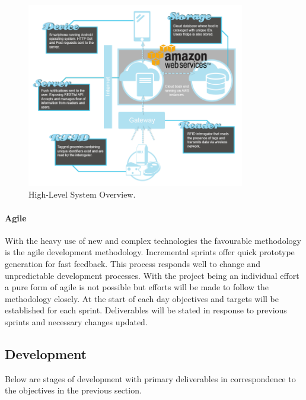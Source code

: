 \documentclass[a4paper, 11pt]{article}
\begin{document}
\begin{figure}[h!]
  \centering
    \includegraphics[width=0.85\textwidth]{system6.png}
      \caption{High-Level System Overview.}
\end{figure}

  \vspace{\baselineskip}

\paragraph{Agile}With the heavy use of new and complex technologies the favourable methodology is the agile development methodology. Incremental sprints offer quick prototype generation for fast feedback. This process responds well to change and unpredictable development processes. With the project being an individual effort a pure form of agile is not possible but efforts will be made to follow the methodology closely. At the start of each day objectives and targets will be established for each sprint. Deliverables will be stated in response to previous sprints and necessary changes updated.

\subsection{Development}
Below are stages of development with primary deliverables in correspondence to the objectives in the previous section.
\end{document}
